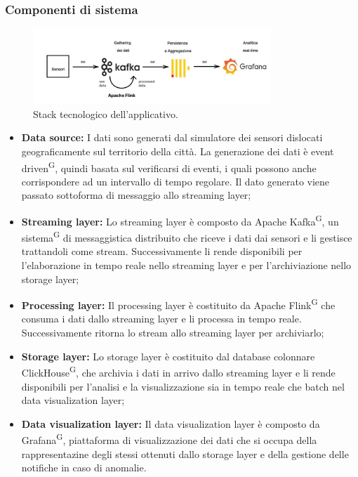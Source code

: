 \documentclass[8pt]{article}
\newcommand{\glossterm}[1]{#1\textsuperscript{G}} %
\begin{document}
\subsubsection{Componenti di sistema}
\begin{figure}[h!]
    \centering
    \includegraphics[width=0.8\textwidth]{images_st/stack.jpg}
    \caption{Stack tecnologico dell'applicativo.}
    \label{fig:Stack tecnologico dell'applicativo}
\end{figure}
\begin{itemize}
	\setlength\itemsep{0em}
    \item \textbf{Data source:} I dati sono generati dal simulatore dei sensori dislocati geograficamente sul territorio della città. La generazione dei dati è \glossterm{event driven}, quindi basata sul verificarsi di eventi, i quali possono anche corrispondere ad un intervallo di tempo regolare. Il dato generato viene passato sottoforma di messaggio allo streaming layer; 
    \item \textbf{Streaming layer:} Lo streaming layer è composto da Apache \glossterm{Kafka}, un \glossterm{sistema} di messaggistica distribuito che riceve i dati dai sensori e li gestisce trattandoli come stream. Successivamente li rende disponibili per l’elaborazione in tempo reale nello streaming layer e per l'archiviazione nello storage layer; 
    \item \textbf{Processing layer:} Il processing layer è costituito da Apache \glossterm{Flink} che consuma i dati dallo streaming layer e li processa in tempo reale. Successivamente ritorna lo stream allo streaming layer per archiviarlo;
    \item \textbf{Storage layer:} Lo storage layer è costituito dal database colonnare \glossterm{ClickHouse}, che archivia i dati in arrivo dallo streaming layer e li rende disponibili per l’analisi e la visualizzazione sia in tempo reale che batch nel data visualization layer;
    \item \textbf{Data visualization layer:} Il data visualization layer è composto da \glossterm{Grafana}, piattaforma di visualizzazione dei dati che si occupa della rappresentazine degli stessi ottenuti dallo storage layer e della gestione delle notifiche in caso di anomalie.
\end{itemize}
\end{document}
